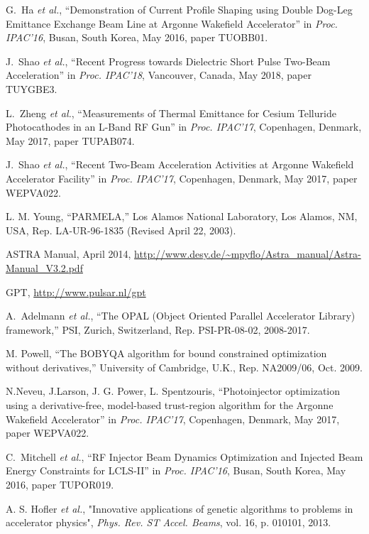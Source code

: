 \documentclass[letterpaper,  %
              ]{jacow-2_3}   %
\begin{document}
\begin{thebibliography}{99}
G.~Ha \emph{et al.}, “Demonstration of Current Profile 
Shaping using Double Dog-Leg Emittance Exchange Beam 
Line at Argonne Wakefield Accelerator”
in \textit{Proc. IPAC’16}, 
Busan, South Korea, May 2016, 
paper TUOBB01.

J.~Shao \emph{et al.}, “Recent Progress towards Dielectric Short Pulse Two-Beam Acceleration”
in \textit{Proc. IPAC’18}, 
Vancouver, Canada, May 2018, 
paper TUYGBE3.

L.~Zheng \emph{et al.}, “Measurements of Thermal Emittance 
for Cesium Telluride Photocathodes in an L-Band RF Gun”
in \textit{Proc. IPAC’17}, 
Copenhagen, Denmark, May 2017, 
paper TUPAB074.

J.~Shao \emph{et al.}, “Recent Two-Beam 
Acceleration Activities at Argonne Wakefield Accelerator Facility”
in \textit{Proc. IPAC’17}, 
Copenhagen, Denmark, May 2017, 
paper WEPVA022.

L. M. Young, “PARMELA,”
Los Alamos National Laboratory, 
Los Alamos, NM, USA,
Rep. LA-UR-96-1835 (Revised April 22, 2003).

ASTRA Manual, April 2014, 
\url{http://www.desy.de/~mpyflo/Astra_manual/Astra-Manual_V3.2.pdf}

GPT,  \url{http://www.pulsar.nl/gpt}

A.~Adelmann \emph{et al.},
“The OPAL (Object Oriented Parallel Accelerator Library) framework,”
PSI, Zurich, Switzerland,
Rep. PSI-PR-08-02, 2008-2017.

M. Powell, “The BOBYQA algorithm for bound constrained
optimization without derivatives,” University of Cambridge,
U.K., Rep. NA2009/06, Oct. 2009.

N.Neveu, J.Larson, J. G. Power, L. Spentzouris, 
“Photoinjector optimization using a derivative-free, model-based trust-region algorithm for the Argonne Wakefield Accelerator”
in \textit{Proc. IPAC’17}, 
Copenhagen, Denmark, May 2017, 
paper WEPVA022.

C.~Mitchell \emph{et al.}, “RF Injector Beam Dynamics Optimization 
and Injected Beam Energy Constraints for LCLS-II”
in \textit{Proc. IPAC’16}, 
Busan, South Korea, May 2016, 
paper TUPOR019.

A. S. Hofler \emph{et al.},
"Innovative applications of genetic algorithms to 
problems in accelerator physics",
\emph{Phys. Rev. ST Accel. Beams}, vol. 16,
p. 010101, 2013.


\end{thebibliography}
\end{document}
